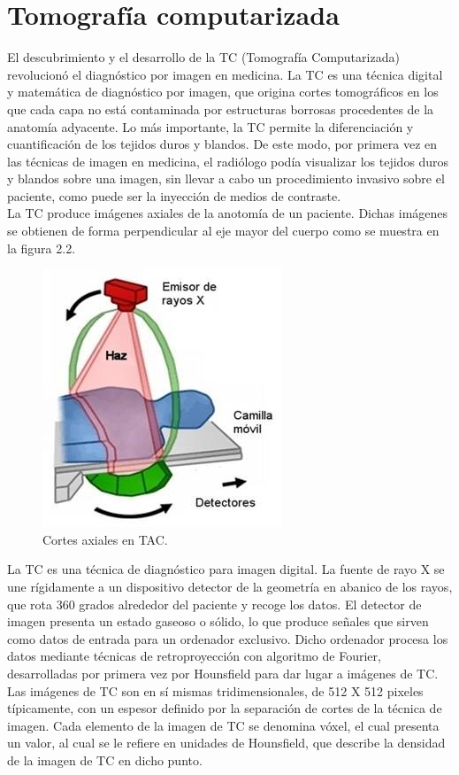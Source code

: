 \documentclass[12pt]{report}
\begin{document}
\section{Tomografía computarizada}
El descubrimiento y el desarrollo de la TC (Tomografía Computarizada) revolucionó el diagnóstico por imagen en medicina. La TC es una técnica digital y matemática de diagnóstico por imagen, que origina cortes tomográficos en los que cada capa no está contaminada por estructuras borrosas procedentes de la anatomía adyacente. Lo más importante, la TC permite la diferenciación y cuantificación de los tejidos duros y blandos. De este modo, por primera vez en las técnicas de imagen en medicina, el radiólogo podía visualizar los tejidos duros y blandos sobre una imagen, sin llevar a cabo un procedimiento invasivo sobre el paciente, como puede ser la inyección de medios de contraste.\\
La TC produce imágenes axiales de la anotomía de un paciente. Dichas imágenes se obtienen de forma perpendicular al eje mayor del cuerpo como se muestra en la figura 2.2.

\begin{figure}[H]
\centering
\includegraphics[width = 5 cm, height = 5 cm]{tac}
\caption{Cortes axiales en TAC.}
\end{figure}

 La TC es una técnica de diagnóstico para imagen digital. La fuente de rayo X se une rígidamente a un dispositivo detector de la geometría en abanico de los rayos, que rota 360 grados alrededor del paciente y recoge los datos. El detector de imagen presenta un estado gaseoso o sólido, lo que produce señales que sirven como datos de entrada para un ordenador exclusivo. Dicho ordenador procesa los datos mediante técnicas de retroproyección con algoritmo de Fourier, desarrolladas por primera vez por Hounsfield para dar lugar a imágenes de TC. Las imágenes de TC son en sí mismas tridimensionales, de 512 X 512 pixeles típicamente, con un espesor definido por la separación de cortes de la técnica de imagen. Cada elemento de la imagen de TC se denomina vóxel, el cual presenta un valor, al cual se le refiere en unidades de Hounsfield, que describe la densidad de la imagen de TC en dicho punto.\cite{prote}\\
 
\end{document}
